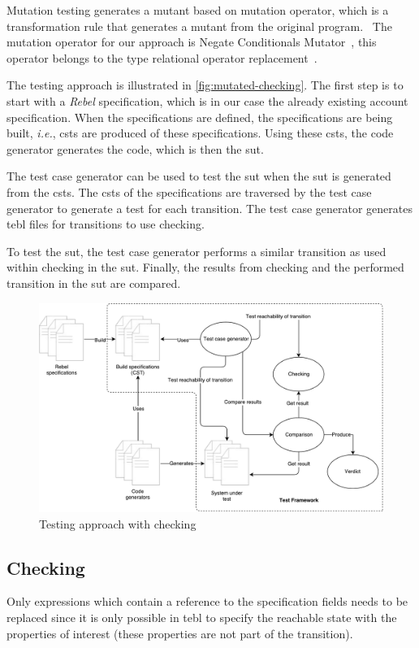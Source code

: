 Mutation testing generates a mutant based on
mutation operator, which is a transformation rule that generates a mutant from
the original program.~\cite[p.~3-4]{jia2011analysis} The mutation operator for
our approach is Negate Conditionals Mutator~\cite{pitmutators}, this operator
belongs to the type relational operator
replacement~\cite[p.~688]{king1991fortran}.

The testing approach is illustrated in \autoref{fig:mutated-checking}. The first
step is to start with a \textit{Rebel} specification, which is in our case the already
existing account specification. When the specifications are defined, the
specifications are being built, \textit{i.e.}, \gls{csts} are
produced of these specifications. Using these \gls{csts}, the code generator generates
the code, which is then the \gls{sut}.

The test case generator can be used to test the \gls{sut} when the \gls{sut} is generated
from the \gls{csts}. The \gls{csts} of the specifications are traversed by the test case
generator to generate a test for each transition. The test case generator
generates tebl files for transitions to use checking.

To test the \gls{sut}, the test case generator performs a similar transition
as used within checking in the \gls{sut}. Finally, the results from checking and the
performed transition in the \gls{sut} are compared.

\begin{figure}[h!]
  \centering
  \includegraphics[width=\linewidth{}]{figures/mutated-checking-diagram.pdf}
  \caption{Testing approach with checking}\label{fig:mutated-checking}
\end{figure}
\FloatBarrier

\subsection{Checking}
Only expressions which contain a reference to the specification fields needs to
be replaced since it is only possible in tebl to specify the reachable state
with the properties of interest (these properties are not part of the
transition).

